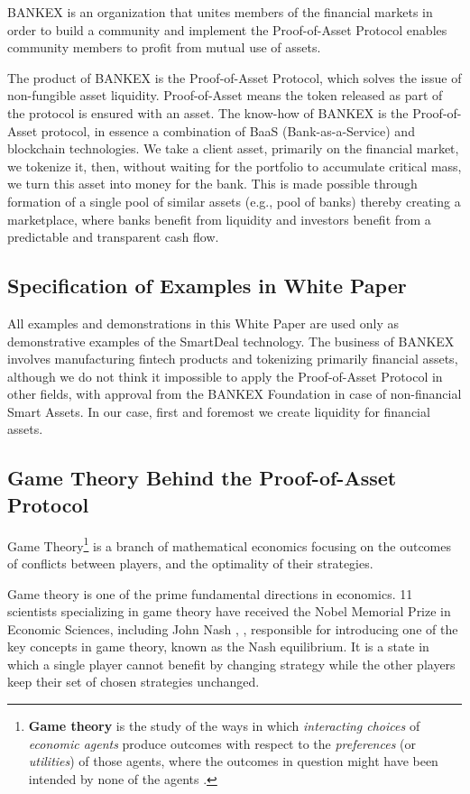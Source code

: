 \documentclass{article}
\begin{document}
\begin{multicols}{2}
BANKEX is an organization that unites members of the financial markets in order to build a community and implement the Proof-of-Asset Protocol enables community members to profit from mutual use of assets. 

The product of BANKEX is the Proof-of-Asset Protocol, which solves the issue of non-fungible asset liquidity. Proof-of-Asset means the token released as part of the protocol is ensured with an asset. 
The know-how of BANKEX is the Proof-of-Asset protocol, in essence a combination of BaaS (Bank-as-a-Service) and blockchain technologies. We take a client asset, primarily on the financial market, we tokenize it, then, without waiting for the portfolio to accumulate critical mass, we turn this asset into money for the bank.  This is made possible through formation of a single pool of similar assets (e.g., pool of banks) thereby creating a marketplace, where banks benefit from liquidity and investors benefit from a predictable and transparent cash flow.

\subsection{Specification of Examples in White Paper}

All examples and demonstrations in this White Paper are used only as demonstrative examples of the SmartDeal technology. The business of BANKEX involves manufacturing fintech products and tokenizing primarily financial assets, although we do not think it impossible to apply the Proof-of-Asset Protocol in other fields, with approval from the BANKEX Foundation in case of non-financial Smart Assets. In our case, first and foremost we create liquidity for financial assets.

\subsection{Game Theory Behind the Proof-of-Asset Protocol}

Game Theory\footnote{\textbf{Game theory} is the study of the ways in which \textit{interacting choices} of \textit{economic agents} produce outcomes with respect to the \textit{preferences} (or \textit{utilities}) of those agents, where the outcomes in question might have been intended by none of the agents \cite{stanfordGameTheory}.} is a branch of mathematical economics focusing on the outcomes of conflicts between players, and the optimality of their strategies.

Game theory is one of the prime fundamental directions in economics. 11 scientists specializing in game theory have received the Nobel Memorial Prize in Economic Sciences, including John Nash \cite{nash1950}, \cite{nash1951}, responsible for introducing one of the key concepts in game theory, known as the Nash equilibrium. It is a state in which a single player cannot benefit by changing strategy while the other players keep their set of chosen strategies unchanged. 


\end{multicols}
\end{document}
